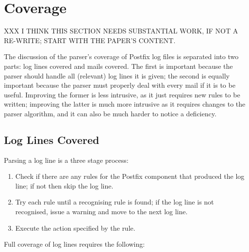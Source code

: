 \section{Coverage}

XXX I THINK THIS SECTION NEEDS SUBSTANTIAL WORK, IF NOT A RE-WRITE\@; START
WITH THE PAPER'S CONTENT\@.

\label{parsing coverage}

The discussion of the parser's coverage of Postfix log files is separated
into two parts: log lines covered and mails covered.  The first is
important because the parser should handle all (relevant) log lines it is
given; the second is equally important because the parser must properly
deal with every mail if it is to be useful.  Improving the former is
less intrusive, as it just requires new rules to be written; improving the
latter is much more intrusive as it requires changes to the parser
algorithm, and it can also be much harder to notice a deficiency.

\subsection{Log Lines Covered}

\label{log-lines-covered}

Parsing a log line is a three stage process:

\begin{enumerate}

    \item Check if there are any rules for the Postfix component that
        produced the log line; if not then skip the log line.

    \item Try each rule until a recognising rule is found; if the log line
        is not recognised, issue a warning and move to the next log line.

    \item Execute the action specified by the rule.

\end{enumerate}

Full coverage of log lines requires the following:


